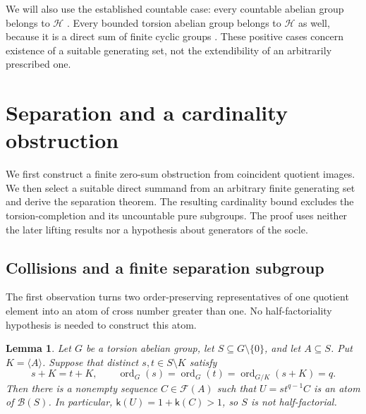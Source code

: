 \documentclass[11pt,reqno]{amsart}
\numberwithin{equation}{section}
\newtheorem{lemma}[theorem]{Lemma}
\theoremstyle{definition}
\theoremstyle{remark}
\newcommand{\HF}{\mathcal H}
\newcommand{\B}{\mathcal B}
\newcommand{\F}{\mathcal F}
\DeclareMathOperator{\ord}{ord}
\begin{document}
We will also use the established countable case:
every countable abelian group belongs to $\HF$
\cite[Theorem~5.3, with $F=0$]{GeroldingerGoebel}.
Every bounded torsion abelian group belongs to $\HF$ as well,
because it is a direct sum of finite cyclic groups \cite{Fuchs}.
These positive cases concern existence of a suitable generating
set, not the extendibility of an arbitrarily prescribed one.

\section{Separation and a cardinality obstruction}\label{sec:cardinality}

We first construct a finite zero-sum obstruction from coincident
quotient images. We then select a suitable direct summand from an
arbitrary finite generating set and derive the separation theorem.
The resulting cardinality bound excludes the torsion-completion and
its uncountable pure subgroups. The proof uses neither the later
lifting results nor a hypothesis about generators of the socle.

\subsection{Collisions and a finite separation subgroup}

The first observation turns two order-preserving representatives of
one quotient element into an atom of cross number greater than one.
No half-factoriality hypothesis is needed to construct this atom.

\begin{lemma}\label{lem:collision}
Let $G$ be a torsion abelian group, let
$S\subseteq G\setminus\{0\}$, and let $A\subseteq S$. Put
$K=\langle A\rangle$. Suppose that distinct $s,t\in S\setminus K$
satisfy
\begin{equation}\label{eq:collision-hypothesis}
 s+K=t+K,\qquad
 \ord_G(s)=\ord_G(t)=\ord_{G/K}(s+K)=q.
\end{equation}
Then there is a nonempty sequence $C\in\F(A)$ such that
$U=st^{q-1}C$ is an atom of $\B(S)$. In particular,
$\mathsf k(U)=1+\mathsf k(C)>1$, so $S$ is not half-factorial.
\end{lemma}
\end{document}
